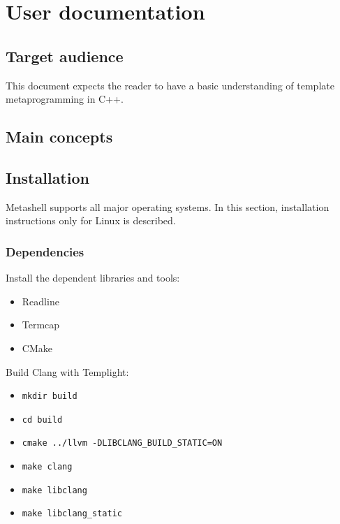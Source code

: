 

\chapter{User documentation}

\section{Target audience}

This document expects the reader to have a basic understanding of template
metaprogramming in C++.


\section{Main concepts}


\section{Installation}

Metashell supports all major operating systems. In this section, installation
instructions only for Linux is described.

\subsection{Dependencies}

Install the dependent libraries and tools:

\begin{itemize}
    \item Readline
    \item Termcap
    \item CMake
\end{itemize}

Build Clang with Templight\cite{templight}:

\begin{itemize}
    \item \lstinline$mkdir build$
    \item \lstinline$cd build$
    \item \lstinline$cmake ../llvm -DLIBCLANG_BUILD_STATIC=ON$
    \item \lstinline$make clang$
    \item \lstinline$make libclang$
    \item \lstinline$make libclang_static$
\end{itemize}

